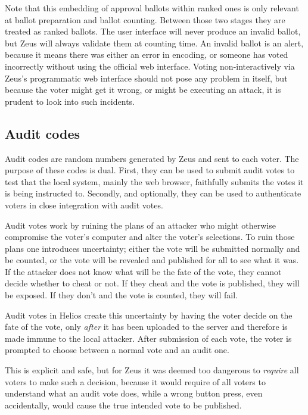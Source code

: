 \documentclass[letterpaper,10pt]{article}
\begin{document}
Note that this embedding of approval ballots within ranked ones is
only relevant at ballot preparation and ballot counting.
Between those two stages they are treated as ranked ballots.
The user interface will never produce an invalid ballot,
but Zeus will always validate them at counting time.
An invalid ballot is an alert, because it means there was either
an error in encoding, or someone has voted incorrectly without using
the official web interface.
Voting non-interactively via Zeus's programmatic web interface
should not pose any problem in itself,
but because the voter might get it wrong,
or might be executing an attack,
it is prudent to look into such incidents.

\subsection{Audit codes}
\label{sec:audit_codes}
Audit codes are random numbers generated by Zeus and sent to each voter.
The purpose of these codes is dual.
First, they can be used to submit audit votes to test that the local
system, mainly the web browser, faithfully submits the votes it is
being instructed to.
Secondly, and optionally, they can be used to authenticate voters in close
integration with audit votes.

Audit votes work by ruining the plans of an attacker who might otherwise
compromise the voter's computer and alter the voter's selections.
To ruin those plans one introduces uncertainty;
either the vote will be submitted normally and be counted,
or the vote will be revealed and published for all to see what it was.
If the attacker does not know what will be the fate of the vote,
they cannot decide whether to cheat or not.
If they cheat and the vote is published, they will be exposed.
If they don't and the vote is counted, they will fail.

Audit votes in Helios create this uncertainty by having the voter decide
on the fate of the vote, only \emph{after} it has been uploaded to the
server and therefore is made immune to the local attacker.
After submission of each vote, the voter is prompted to choose
between a normal vote and an audit one.

This is explicit and safe, but for Zeus it was deemed too dangerous to
\emph{require} all voters to make such a decision, because it would
require of all voters to understand what an audit vote does,
while a wrong button press, even accidentally,
would cause the true intended vote to be published.
\end{document}
